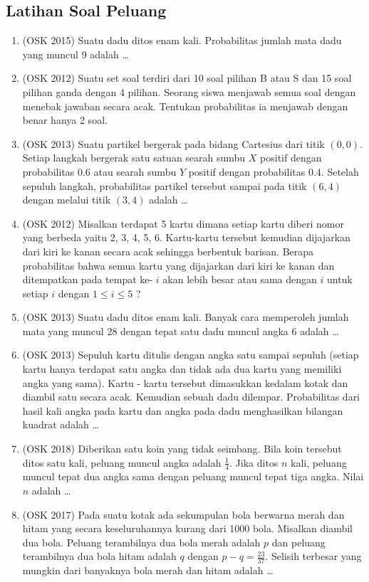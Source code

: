 \subsection{Latihan Soal Peluang}
\begin{enumerate}
        \item (OSK 2015) Suatu dadu ditos enam kali. Probabilitas jumlah mata dadu yang muncul 9 adalah \ldots

        \item (OSK 2012) Suatu set soal terdiri dari 10 soal pilihan B atau S dan 15 soal pilihan ganda dengan 4 pilihan. Seorang siswa menjawab semua soal dengan menebak jawaban secara acak. Tentukan probabilitas ia menjawab dengan benar hanya 2 soal.

        \item (OSK 2013) Suatu partikel bergerak pada bidang Cartesius dari titik $(0, 0)$. Setiap langkah bergerak satu satuan searah sumbu $X$ positif dengan probabilitas $0.6$ atau searah sumbu $Y$ positif dengan probabilitas $0.4$. Setelah sepuluh langkah, probabilitas partikel tersebut sampai pada titik $(6,4)$ dengan melalui titik $(3,4)$ adalah \ldots
        
        \item (OSK 2012) Misalkan terdapat 5 kartu dimana setiap kartu diberi nomor yang berbeda yaitu 2, 3, 4, 5, 6. Kartu-kartu tersebut kemudian dijajarkan dari kiri ke kanan secara acak sehingga berbentuk barisan. Berapa probabilitas bahwa semua kartu yang dijajarkan dari kiri ke kanan dan ditempatkan pada tempat ke- $i$ akan lebih besar atau sama dengan $i$ untuk setiap $i$ dengan $1 \le i \le 5$ ?
        
        \item (OSK 2013) Suatu dadu ditos enam kali. Banyak cara memperoleh jumlah mata yang muncul 28 dengan tepat satu dadu muncul angka 6 adalah \dots
        
        \item (OSK 2013) Sepuluh kartu ditulis dengan angka satu sampai sepuluh (setiap kartu hanya terdapat satu angka dan tidak ada dua kartu yang memiliki angka yang sama). Kartu - kartu tersebut dimasukkan kedalam kotak dan diambil satu secara acak. Kemudian sebuah dadu dilempar. Probabilitas dari hasil kali angka pada kartu dan angka pada dadu menghasilkan bilangan kuadrat adalah \dots
        
        \item (OSK 2018) Diberikan satu koin yang tidak seimbang. Bila koin tersebut ditos satu kali, peluang muncul angka adalah $\frac{1}{4}$. Jika ditos $n$ kali, peluang muncul tepat dua angka sama dengan peluang muncul tepat tiga angka. Nilai $n$ adalah \dots
        
        \item (OSK 2017) Pada suatu kotak ada sekumpulan bola berwarna merah dan hitam yang secara keseluruhannya kurang dari 1000 bola. Misalkan diambil dua bola. Peluang terambilnya dua bola merah adalah $p$ dan peluang terambilnya dua bola hitam adalah $q$ dengan $p-q =\frac{23}{37}$. Selisih terbesar yang mungkin dari banyaknya bola merah dan hitam adalah \dots
\end{enumerate}